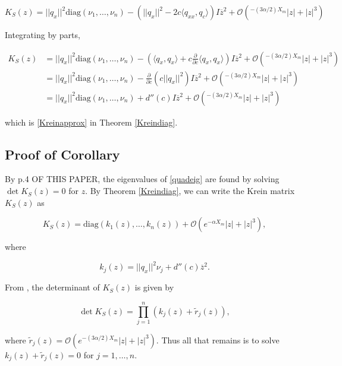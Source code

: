 \documentclass[12pt]{article}
\begin{document}
\begin{equation}\label{Kreinform2}
K_S(z) = ||q_x||^2 \text{diag}(\nu_1, \dots, \nu_n) 
- ( ||q_x||^2 -2 c \langle q_{xx}, q_c \rangle) I \overline{z}^2  + \mathcal{O}(^{-(3 \alpha/2) X_m}|z| + |z|^3)
\end{equation}

Integrating by parts,

\begin{align*}
K_S(z)
&= ||q_x||^2 \text{diag}(\nu_1, \dots, \nu_n) - \left( \langle q_x, q_x \rangle + c \frac{\partial}{\partial c}\langle q_x, q_x \rangle \right)I\overline{z}^2 + \mathcal{O}(^{-(3 \alpha/2) X_m}|z| + |z|^3)  \\
&= ||q_x||^2 \text{diag}(\nu_1, \dots, \nu_n) -\frac{\partial}{\partial c} \left( c||q_x||^2 \right) I \overline{z}^2  + \mathcal{O}(^{-(3 \alpha/2) X_m}|z| + |z|^3) \\
&= ||q_x||^2 \text{diag}(\nu_1, \dots, \nu_n) + d''(c) I \overline{z}^2  + \mathcal{O}(^{-(3 \alpha/2) X_m}|z| + |z|^3)
\end{align*}

which is \eqref{Kreinapprox} in Theorem \ref{Kreindiag}.

\subsection{Proof of Corollary}

By p.4 OF THIS PAPER, the eigenvalues of \eqref{quadeig} are found by solving $\det K_S(z) = 0$ for $z$. By Theorem \ref{Kreindiag}, we can write the Krein matrix $K_S(z)$ as 

\begin{equation}
K_S(z) = \text{diag}(k_1(z), \dots, k_n(z)) + \mathcal{O}(e^{-\alpha X_m}|z| + |z|^3),
\end{equation}

where

\begin{equation}
k_j(z) = ||q_x||^2 \nu_j + d''(c) \overline{z}^2.
\end{equation}

From \cite{Ipsen2008}, the determinant of $K_S(z)$ is given by

\begin{equation}\label{detK}
\det K_S(z) = \prod_{j = 1}^n (k_j(z) + \tilde{r}_j(z)),
\end{equation}

where $\tilde{r}_j(z) = \mathcal{O}(e^{-(3 \alpha/2) X_m}|z| + |z|^3)$. Thus all that remains is to solve $k_j(z) + \tilde{r}_j(z) = 0$ for $j = 1, \dots, n$.\\
\end{document}
